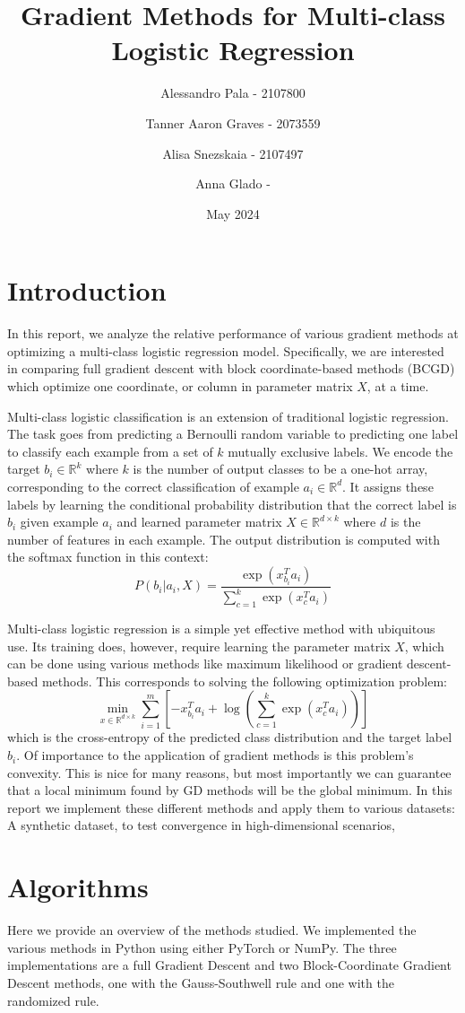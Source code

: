 \documentclass{article}
\title{Gradient Methods for Multi-class Logistic Regression}
\author{Alessandro Pala - 2107800 \and 
Tanner Aaron Graves - 2073559 \and 
Alisa Snezskaia - 2107497 \and
Anna Glado - }
\date{May 2024}
\begin{document}
\maketitle

\section{Introduction}
In this report, we analyze the relative performance of various gradient methods at optimizing a multi-class logistic regression model. Specifically, we are interested in comparing full gradient descent with block coordinate-based methods (BCGD) which optimize one coordinate, or column in parameter matrix $X$, at a time. 

Multi-class logistic classification is an extension of traditional logistic regression. The task goes from predicting a Bernoulli random variable to predicting one label to classify each example from a set of $k$ mutually exclusive labels. We encode the target $b_i \in \mathbb{R}^k$ where $k$ is the number of output classes to be a one-hot array, corresponding to the correct classification of example $a_i \in \mathbb{R}^d$. It assigns these labels by learning the conditional probability distribution that the correct label is $b_i$ given example $a_i$ and learned parameter matrix $X \in \mathbb{R}^{d \times k}$ where $d$ is the number of features in each example. The output distribution is computed with the softmax function in this context: 
$$P(b_i|a_i, X) = \frac{\exp(x_{b_i}^T a_i)}{\sum_{c=1}^k\exp(x_c^T a_i)}$$

Multi-class logistic regression is a simple yet effective method with ubiquitous use. Its training does, however, require learning the parameter matrix $X$, which can be done using various methods like maximum likelihood or gradient descent-based methods. This corresponds to solving the following optimization problem:
$$\min_{x \in \mathbb{R}^{d \times k}} \sum\limits_{i=1}^{m}[-x^T_{b_i}a_i + \log(\sum\limits_{c=1}^k\exp(x_c^T a_i))]$$
which is the cross-entropy of the predicted class distribution and the target label $b_i$. Of importance to the application of gradient methods is this problem's convexity. This is nice for many reasons, but most importantly we can guarantee that a local minimum found by GD methods will be the global minimum.  
In this report we implement these different methods and apply them to various datasets: A synthetic dataset, to test convergence in high-dimensional scenarios, 

\section{Algorithms}
Here we provide an overview of the methods studied. We implemented the various methods in Python using either PyTorch or NumPy. The three implementations are a full Gradient Descent and two Block-Coordinate Gradient Descent methods, one with the Gauss-Southwell rule and one with the randomized rule.  
\end{document}
